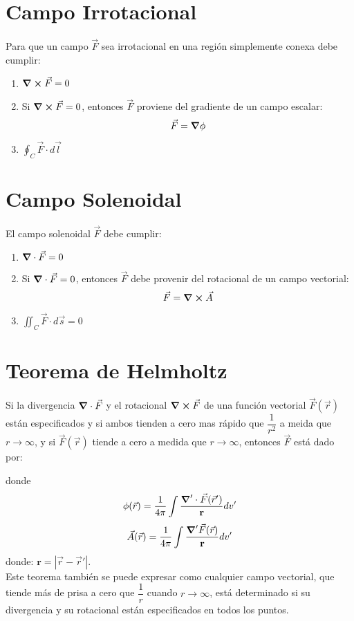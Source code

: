 \documentclass[../main]{subfiles}
\begin{document}
\section{Campo Irrotacional}
Para que un campo $\vec{F}$ sea irrotacional en una región simplemente conexa debe cumplir:
\begin{enumerate}
    \item $\grad \cross \vec{F}=0$
    \item Si $\grad \cross \vec{F}=0$, entonces $\vec{F}$ proviene del gradiente de un campo escalar:
    $$
    \vec{F}=\grad{\phi}
    $$
    \item $\displaystyle \oint_C \vec{F}\cdot d\vec{l}$
\end{enumerate}
\section{Campo Solenoidal}
El campo solenoidal $\vec{F}$ debe cumplir:
\begin{enumerate}
    \item $\grad \cdot \vec{F}=0$
    \item Si $\grad \cdot \vec{F}=0$, entonces $\vec{F}$ debe  provenir del rotacional de un campo vectorial:
    $$
    \vec{F}=\grad \cross \vec{A}
    $$
    \item $\displaystyle \iint_C \vec{F}\cdot d\vec{s}=0$
\end{enumerate}
\section{Teorema de Helmholtz}
Si la divergencia $\grad \cdot \vec{F}$ y el rotacional $\grad \cross \vec{F}$ de una función vectorial $\vec{F}(\vec{r})$ están especificados y si ambos tienden a cero mas rápido que $\dfrac{1}{r^2}$ a meida que $r \rightarrow \infty$, y si $\vec{F}(\vec{r})$ tiende a cero a medida que $r \rightarrow \infty$, entonces $\vec{F}$ está dado por:
\begin{center}
\end{center}
donde
\begin{equation}
    \phi(\vec{r})=\dfrac{1}{4\pi} \int \dfrac{\grad' \cdot \vec{F}(\vec{r}')}{\mathbf{r}} dv'
\end{equation}
\begin{equation}
    \vec{A}(\vec{r})=\dfrac{1}{4\pi} \int \dfrac{\grad' \vec{F}(\vec{r})}{\mathbf{r}}dv'
\end{equation}
donde: $\mathbf{r}=|\vec{r}-\vec{r}'|$. \\
Este teorema también se puede expresar como cualquier campo vectorial, que tiende más de prisa a cero que $\dfrac{1}{r}$ cuando $r \rightarrow \infty$, está determinado si su divergencia y su rotacional están especificados en todos los puntos.
\end{document}
